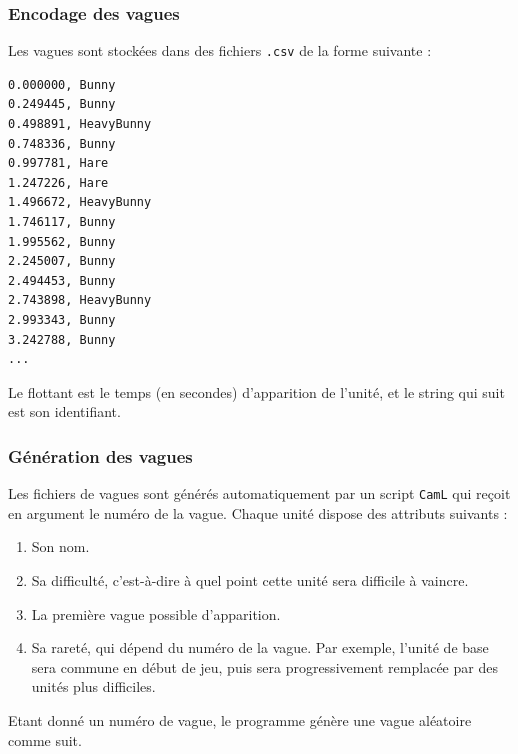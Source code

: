 \documentclass[a4paper,11pt]{article}
\begin{document}
\subsubsection*{Encodage des vagues}

Les vagues sont stockées dans des fichiers \texttt{.csv} de la forme suivante :

\begin{verbatim}
0.000000, Bunny
0.249445, Bunny
0.498891, HeavyBunny
0.748336, Bunny
0.997781, Hare
1.247226, Hare
1.496672, HeavyBunny
1.746117, Bunny
1.995562, Bunny
2.245007, Bunny
2.494453, Bunny
2.743898, HeavyBunny
2.993343, Bunny
3.242788, Bunny
...
\end{verbatim}

Le flottant est le temps (en secondes) d'apparition de l'unité, et le string qui suit est son identifiant. \newline

\subsubsection*{Génération des vagues}

Les fichiers de vagues sont générés automatiquement par un script \texttt{CamL} qui reçoit en argument le numéro de la vague. Chaque unité dispose des attributs suivants :

\begin{enumerate}
\item Son nom.
\item Sa difficulté, c'est-à-dire à quel point cette unité sera difficile à vaincre.
\item La première vague possible d'apparition.
\item Sa rareté, qui dépend du numéro de la vague. Par exemple, l'unité de base sera commune en début de jeu, puis sera progressivement remplacée par des unités plus difficiles.
\end{enumerate}

Etant donné un numéro de vague, le programme génère une vague aléatoire comme suit.
\end{document}
